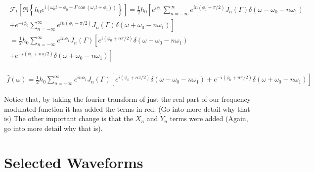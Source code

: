 \documentclass[onecolumn, groupedaddress, 10pt]{revtex4-1}
\begin{document}
\begin{align}
\begin{split}
\mathcal{F}_t \left[ \Re \left\{ h_0 e^{i\left( \omega_0 t + \phi_0 + \Gamma \cos( \omega_1 t + \phi_1 ) \right)} \right\} \right]
= \frac{1}{2} h_0 \left[ e^{ i\phi_0} \sum_{n=-\infty}^{\infty} e^{in(\phi_1 + \pi/2)} J_n(\Gamma)  \delta(\omega - \omega_0 - n\omega_1) \right.	\\
+ \left. e^{-i\phi_0} \sum_{n=-\infty}^{\infty} e^{in(\phi_1 - \pi/2)} J_n(\Gamma)  \delta(\omega + \omega_0 - n\omega_1) \right]					\\
= \frac{1}{2} h_0 \sum_{n=-\infty}^{\infty} e^{in\phi_1} J_n (\Gamma) \left[ e^{i(\phi_0 + n\pi/2)} \delta(\omega - \omega_0 - n\omega_1) \right.	\\
+ \left. e^{-i(\phi_0 + n\pi/2)} \delta(\omega + \omega_0 - n\omega_1) \right]
\end{split}
\end{align}



\begin{align}
\label{eqn:realFourierTransform}
\hat{f}(\omega) = 
\frac{1}{2} h_0 \sum_{n=-\infty}^{\infty} e^{in\phi_1} J_n (\Gamma) \left[ e^{i(\phi_0 + n\pi/2)} \delta(\omega - \omega_0 - n\omega_1)
+ e^{-i(\phi_0 + n\pi/2)} \delta(\omega + \omega_0 - n\omega_1) \right]
\end{align}

Notice that, by taking the fourier transform of just the real part of our frequency modulated function it has added the terms in red.  (Go into more detail why that is)  The other important change is that the $X_n$ and $Y_n$ terms were added (Again, go into more detail why that is).

\pagebreak

\section{Selected Waveforms}
\end{document}
